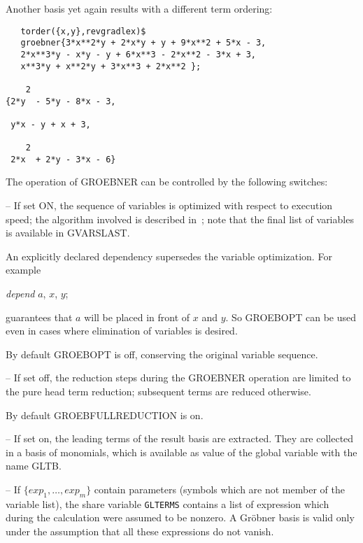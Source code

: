 Another basis yet again results with a different term ordering:
\begin{verbatim}
   torder({x,y},revgradlex)$
   groebner{3*x**2*y + 2*x*y + y + 9*x**2 + 5*x - 3,
   2*x**3*y - x*y - y + 6*x**3 - 2*x**2 - 3*x + 3,
   x**3*y + x**2*y + 3*x**3 + 2*x**2 };

    2
{2*y  - 5*y - 8*x - 3,

 y*x - y + x + 3,

    2
 2*x  + 2*y - 3*x - 6}

\end{verbatim}


The operation of GROEBNER can be controlled by the following
switches:
\begin{description}
\item[GROEBOPT] -- If set ON, the sequence of variables is optimized
with respect to execution speed; the algorithm involved is described
in~\cite{Boege:86}; note that the final list of variables is available in
GVARSLAST.

An explicitly declared dependency supersedes the
variable optimization. For example
\begin{center}
{\it depend} $a$, $x$, $y$;
\end{center}
guarantees that $a$ will be placed in front of $x$ and $y$. So
GROEBOPT can be used even in cases where elimination of variables is
desired.

By default GROEBOPT is off, conserving the original variable
sequence.

\item[GROEBFULLREDUCTION] -- If set off, the reduction steps during
the \linebreak[4] GROEBNER operation are limited to the pure head
term reduction; subsequent terms are reduced otherwise.

By default GROEBFULLREDUCTION is on.

\item[GLTBASIS] -- If set on, the leading terms of the result basis are
extracted. They are collected in a basis of monomials, which is
available as value of the global variable with the name GLTB.

\item[GLTERMS] -- If $\{exp_1, \ldots , exp_m\} $ contain parameters
(symbols which are not member of the variable list), the share variable
{\tt GLTERMS} contains a list of expression which during the
calculation were assumed to be nonzero. A Gr\"obner basis
is valid only under the assumption that all these expressions do
not vanish.

\end{description}

